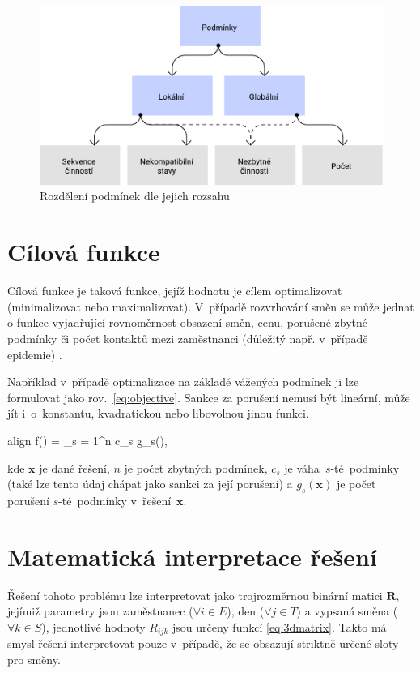 \documentclass[twoside]{ctuthesis}
\newcommand{\coloredeq}[2]{\begin{empheq}[box=\colorbox{Gray}]{align}\label{#1}\hspace{1em}#2\hspace{1em}\end{empheq}}
\begin{document}
\begin{figure}[h]
	\includegraphics[scale=0.7]{img/constraints.pdf}
	\caption{Rozdělení podmínek dle jejich rozsahu}
	\label{fig:constraints}
\end{figure}

\section{Cílová funkce}
\label{sec:objective}
Cílová funkce je taková funkce, jejíž hodnotu je cílem optimalizovat (minimalizovat nebo maximalizovat). V~případě rozvrhování směn se může jednat o funkce vyjadřující rovnoměrnost obsazení směn, cenu, porušené zbytné podmínky \cite{blochliger2004modeling} či počet kontaktů mezi zaměstnanci (důležitý např. v~případě epidemie) \cite{zucchi2020personnel}.

Například v~případě optimalizace na základě vážených podmínek ji lze formulovat jako rov.~\ref{eq:objective}. Sankce za porušení nemusí být lineární, může jít i~o~konstantu, kvadratickou nebo libovolnou jinou funkci. \cite{kletzander2020solving}
\coloredeq{eq:objective}{
	f() = \sum_{s = 1}^n c_s \cdot g_s(\boldsymbol{x}),
}
kde $\boldsymbol{x}$ je dané řešení, $n$ je počet zbytných podmínek, $c_s$ je váha~$s$-té~podmínky (také lze tento údaj chápat jako sankci za její porušení) a $g_s(\boldsymbol{x})$ je počet porušení $s$-té~podmínky v~řešení~$\boldsymbol{x}$. \cite{awadallah2015hybrid}

\section{Matematická interpretace řešení}
Řešení tohoto problému lze interpretovat jako trojrozměrnou binární matici $\boldsymbol{R}$, jejímiž parametry jsou zaměstnanec ($\forall i \in E$), den ($\forall j \in T$) a vypsaná směna ($\forall k \in S$), jednotlivé hodnoty $R_{ijk}$ jsou určeny funkcí \ref{eq:3dmatrix}. \cite{vaclavik2016roster} Takto má smysl řešení interpretovat pouze v~případě, že se obsazují striktně určené sloty pro směny.
\end{document}
